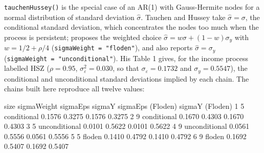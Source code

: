\documentclass[
  nojss]{jss}
\begin{document}
\texttt{tauchenHussey()} is the special case of an AR(1) with Gauss-Hermite nodes
for a normal distribution of standard deviation \(\hat\sigma\). Tauchen and
Hussey take \(\hat\sigma=\sigma\), the conditional standard deviation, which
concentrates the nodes too much when the process is persistent;
\cite{floden2008} proposes the weighted choice
\(\hat\sigma = w\sigma + (1-w)\sigma_y\) with \(w = 1/2 + \rho/4\)
(\texttt{sigmaWeight\ =\ "floden"}), and also reports \(\hat\sigma=\sigma_y\)
(\texttt{sigmaWeight\ =\ "unconditional"}). His Table 1 gives, for the income process labelled HSZ
(\(\rho = 0.95\), \(\sigma_\varepsilon^2 = 0.030\),
so that \(\sigma_\varepsilon = 0.1732\) and \(\sigma_y = 0.5547\)), the
conditional and unconditional standard deviations implied by each chain.
The chains built here reproduce all twelve values:

\begin{CodeChunk}
\begin{CodeOutput}
  size   sigmaWeight sigmaEps sigmaY sigmaEps (Floden) sigmaY (Floden)
1    5   conditional   0.1576 0.3275            0.1576          0.3275
2    9   conditional   0.1670 0.4303            0.1670          0.4303
3    5 unconditional   0.0101 0.5622            0.0101          0.5622
4    9 unconditional   0.0561 0.5556            0.0561          0.5556
5    5        floden   0.1410 0.4792            0.1410          0.4792
6    9        floden   0.1692 0.5407            0.1692          0.5407
\end{CodeOutput}
\end{CodeChunk}
\end{document}
